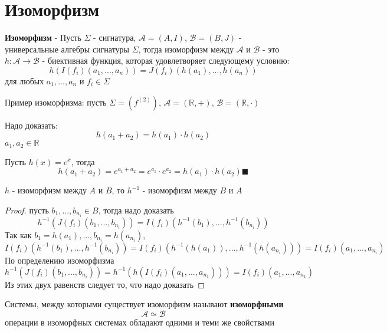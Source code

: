 \documentclass[../main/document.tex]{subfiles}
\begin{document}
\section{Изоморфизм}
\begin{dfn}
\textbf{Изоморфизм} - Пусть $\Sigma$ - сигнатура, $\mathcal{A}=(A,I)$, $\mathcal{B}=(B,J)$ - \\
 универсальные алгебры сигнатуры $\Sigma$, тогда изоморфизм между $\mathcal{A}$ и $\mathcal{B}$ - это $h:\mathcal{A}\rightarrow \mathcal{B}$ - биективная функция, которая удовлетворяет следующему условию:
$$h(I(f_i)(a_1,...,a_n))=J(f_i)(h(a_1),...,h(a_n))$$
для любых $a_1,...,a_n$ и $f_i\in \Sigma$
\end{dfn}

\begin{exm}
Пример изоморфизма: пусть $\Sigma=(f^{(2)})$, $\mathcal{A}=(\mathbb{R},+)$, $\mathcal{B}=(\mathbb{R},\cdot)$

Надо доказать: 
$$h(a_1+a_2)=h(a_1)\cdot h(a_2)$$
$a_1,a_2\in \mathbb{R}$

Пусть $h(x)=e^x$, тогда
$$h(a_1+a_2)=e^{a_1+a_2}=e^{a_1}\cdot e^{a_2}=h(a_1)\cdot h(a_2)\blacksquare$$
\end{exm}

\begin{thm}\label{isomorphism-inverse}
$h$ - изоморфизм между $A$ и $B$, то $h^{-1}$ - изоморфизм между $B$ и $A$
\begin{proof} пусть $b_1,...,b_{n_i}\in B$, тогда надо доказать
$$h^{-1}(J(f_i)(b_1,...,b_{n_i}))=I(f_i)(h^{-1}(b_1),...,h^{-1}(b_{n_i}))$$
Так как $b_1=h(a_1),...,b_{n_i}=h(a_{n_i})$,
$$I(f_i)(h^{-1}(b_1),...,h^{-1}(b_{n_i}))=I(f_i)(h^{-1}(h(a_1)),...,h^{-1}(h(a_{n_i})))=I(f_i)(a_1,...,a_{n_i})$$
По определению изоморфизма
$$h^{-1}(J(f_i)(b_1,...,b_{n_i}))=h^{-1}(h(I(f_i)(a_1,...,a_{n_1})))=I(f_i)(a_1,...,a_{n_1})$$
Из этих двух равенств следует то, что надо доказать
\end{proof}
\end{thm}

\begin{dfn}
Системы, между которыми существует изоморфизм называют \textbf{изоморфными}
$$\mathcal{A}\simeq\mathcal{B}$$
операции в изоморфных системах обладают одними и теми же свойствами
\end{dfn}
\end{document}
